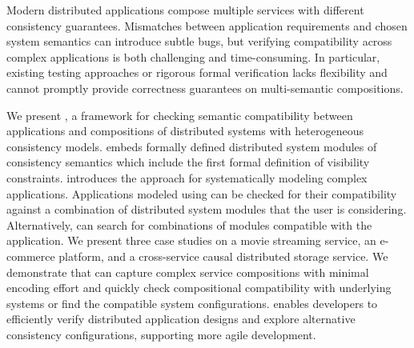 Modern distributed applications compose multiple services with
different consistency guarantees. Mismatches between application
requirements and chosen system semantics can introduce subtle bugs,
but verifying compatibility across complex applications is both
challenging and time-consuming. In particular, existing testing approaches
or rigorous formal verification lacks flexibility and cannot
promptly provide correctness guarantees on multi-semantic compositions.

We present \sysname{}, a framework for checking semantic
compatibility between applications and compositions of distributed
systems with heterogeneous consistency models. \sysname{} embeds
formally defined distributed system modules of
consistency semantics which include the first formal definition of
visibility constraints. \sysname{} introduces the \sysgraph{} approach for
systematically modeling complex applications. Applications modeled
using \sysgraphs{} can be checked for their compatibility against a
combination of distributed system modules that the user is considering. 
Alternatively, \sysname{}
can search for combinations of modules compatible with the application.
We present three case studies on a movie streaming service, an
e-commerce platform, and a cross-service causal distributed storage service.
We demonstrate that \sysname{} can capture complex service compositions
with minimal encoding effort and quickly check compositional compatibility with
underlying systems or find the compatible system configurations. \sysname{}
enables developers to efficiently verify distributed application designs
and explore alternative consistency configurations, supporting more
agile development.
